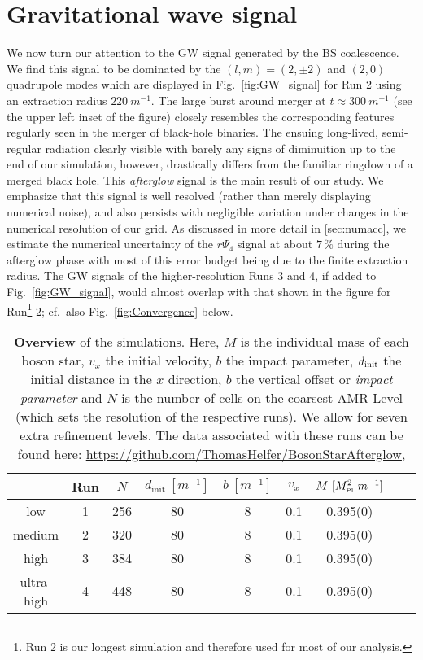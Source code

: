 \documentclass[11pt]{report}  %
\newcommand{\mpl}{M_{\mbox{\tiny Pl}}}
\begin{document}
\section{Gravitational wave signal}\label{sec:GWs}

We now turn our attention to the GW signal generated by the
BS coalescence. We find this signal to be dominated by the
$(l,m)=(2,\pm 2)$ and $(2,0)$ quadrupole modes which are
displayed in Fig.~\ref{fig:GW_signal} for Run 2 using an extraction
radius $220~m^{-1}$. The large burst around merger at $t\approx300~m^{-1}$ (see the upper left inset of the figure)
closely resembles the corresponding features
regularly seen in the merger of black-hole binaries.
The ensuing long-lived, semi-regular radiation clearly visible
with barely any signs of diminuition up to the end of our
simulation, however, drastically
differs from the familiar ringdown of a merged black hole. This
{\it afterglow} signal is the main result of our study. We
emphasize that this signal is well resolved (rather than
merely displaying numerical noise), and also persists with
negligible variation under changes in the numerical resolution
of our grid. As discussed in more detail in
\ref{sec:numacc}, we estimate the numerical uncertainty
of the $r\Psi_4$ signal at about $7\,\%$ during the afterglow phase
with most of this error budget being due to the finite extraction radius.
The GW signals of the higher-resolution Runs 3 and 4, if added
to Fig.~\ref{fig:GW_signal}, would almost overlap with
that shown in the figure for Run\footnote{Run 2 is our longest simulation
and therefore used for most of our analysis.} 2;
cf.~also Fig.~\ref{fig:Convergence} below.
\begin{table}
\begin{center}
\begin{tabular}{ c  c  c  c  c  c  c  c  c}
     \toprule
      & Run & $N$      & $d_{\text{init}}~[m^{-1}]$   & $b~[m^{-1}]$  & $v_x$ &  $M~[\mpl^2~m^{-1}]$  \\ 
     \midrule
     low &  1    & 256 & 80 & 8  & 0.1 & 0.395(0) \\
     medium &  2   & 320 & 80 & 8 & 0.1 & 0.395(0) \\
     high &  3    & 384 & 80 & 8 & 0.1 &  0.395(0)\\
     ultra-high &  4    & 448 & 80 & 8 & 0.1 &  0.395(0) \\
     \bottomrule
\end{tabular}
\caption{{\bf Overview} of the simulations. Here, $M$ is the individual mass of each boson star, $v_x$ the initial velocity, $b$ the impact parameter, $d_{\rm init}$ the initial distance in the $x$ direction, $b$ the vertical offset or {\it impact parameter} and $N$ is the number of cells on the coarsest AMR Level (which sets the resolution of the respective runs). We allow for seven extra refinement levels. The data associated with these runs can be found here: \url{https://github.com/ThomasHelfer/BosonStarAfterglow},}
\label{tab:Overview Runs}
\end{center}
\end{table}
\end{document}
